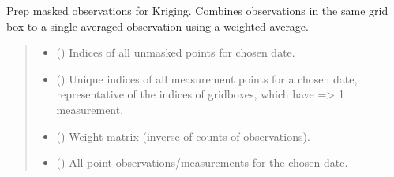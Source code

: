 \documentclass[letterpaper,10pt,english]{sphinxmanual}
\begin{document}
\begin{fulllineitems}
\label{\detokenize{kriging:glomar_gridding.kriging.prep_obs_for_kriging}}
\pysigstartsignatures
\pysiglinewithargsret
{}
{\sphinxparamcomma {}\sphinxparamcomma {}\sphinxparamcomma {}\sphinxparamcomma {}\sphinxparamcomma {}\sphinxparamcomma {}}
{}
\pysigstopsignatures
\sphinxAtStartPar
Prep masked observations for Kriging. Combines observations in the same
grid box to a single averaged observation using a weighted average.
\begin{quote}\begin{description}
\begin{itemize}
\item {}
\sphinxAtStartPar
{} (\sphinxstyleliteralemphasis{\sphinxupquote{{[}}}\sphinxstyleliteralemphasis{\sphinxupquote{{]}}}) \textendash{} Indices of all un\sphinxhyphen{}masked points for chosen date.

\item {}
\sphinxAtStartPar
{} (\sphinxstyleliteralemphasis{\sphinxupquote{{[}}}\sphinxstyleliteralemphasis{\sphinxupquote{{]}}}) \textendash{} Unique indices of all measurement points for a chosen date,
representative of the indices of gridboxes, which have =\textgreater{} 1 measurement.

\item {}
\sphinxAtStartPar
{} (\sphinxstyleliteralemphasis{\sphinxupquote{{[}}}\sphinxstyleliteralemphasis{\sphinxupquote{{]}}}) \textendash{} Weight matrix (inverse of counts of observations).

\item {}
\sphinxAtStartPar
{} (\sphinxstyleliteralemphasis{\sphinxupquote{{[}}}\sphinxstyleliteralemphasis{\sphinxupquote{{]}}}) \textendash{} All point observations/measurements for the chosen date.


\end{itemize}
\end{description}
\end{quote}
\end{fulllineitems}
\end{document}

